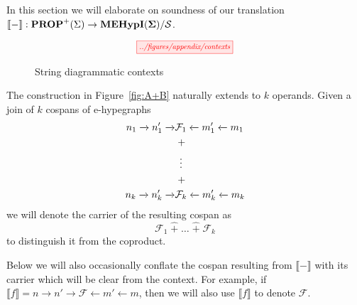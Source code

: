 In this section we will elaborate on soundness of our translation $\llbracket - \rrbracket : \textbf{PROP}^{+}(\Sigma) \to {\mathbf{MEHypI(\Sigma)}} / \mathcal{S}$.

\begin{figure}
    \[
    \scalebox{0.75}{
        \tikzfig{../figures/appendix/contexts}
    }
    \]
    \caption{String diagrammatic contexts}
    \label{fig:string_contexts}
\end{figure}

\begin{remark}
    The construction in Figure~\ref{fig:A+B} naturally extends to $k$ operands.
    Given a join of $k$ cospans of e-hypegraphs
    \begin{align*}
        n_1 \xrightarrow{} n_1' \xrightarrow{} &\mathcal{F}_1 \xleftarrow{} m_1' \xleftarrow{} m_1\\
        &\;+\\
        &\vdotswithin{+}\\
        &\;+\\
        n_k \xrightarrow{} n_k' \xrightarrow{} &\mathcal{F}_k \xleftarrow{} m_k' \xleftarrow{} m_k
    \end{align*}
    we will denote the carrier of the resulting cospan as
    \[
    \mathcal{F}_1 \; \hat{+}\; \ldots\; \hat{+}\; \mathcal{F}_{k}
    \]
    to distinguish it from the coproduct.
\end{remark}

\begin{remark}
    Below we will also occasionally conflate the cospan resulting from $\llbracket - \rrbracket$ with its carrier which will be clear from the context.
    For example, if $\llbracket f \rrbracket = n \to n' \to \mathcal{F} \xleftarrow{} m' \xleftarrow{} m$, then we will also use $\llbracket f \rrbracket$ to denote $\mathcal{F}$.
\end{remark}

